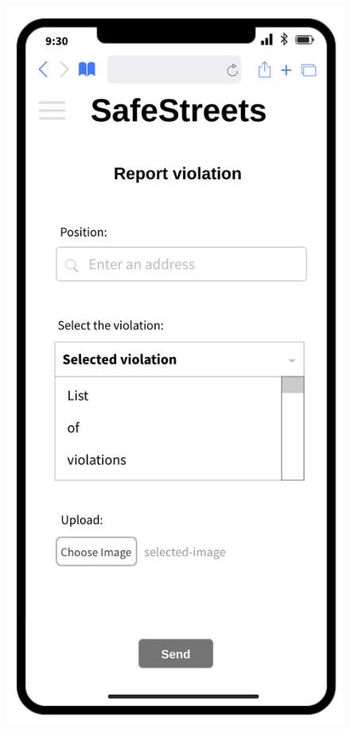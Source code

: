 		\begin{figure}[H]
		\centering
		\begin{minipage}[b]{0.40\textwidth}
			\includegraphics[width=\textwidth]{Images/rasd-mocks/report.png}

\end{minipage}
\end{figure}
